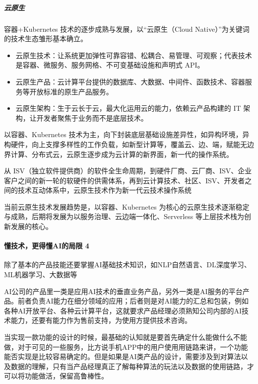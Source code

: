 \documentclass[letterpaper,10pt,english]{sphinxmanual}
\begin{document}
\subparagraph{云原生}
\label{\detokenize{chapter_idea/understand_tech:id32}}
容器+Kubernetes 技术的逐步成熟与发展，以“云原生（Cloud
Native）”为关键词的技术生态雏形基本确立。
\begin{itemize}
\item {} 
云原生技术：让系统更加弹性可靠容错、松耦合、易管理、可观察；代表技术是容器、微服务、服务网格、不可变基础设施和声明式
API。

\item {} 
云原生产品：云计算平台提供的数据库、大数据、中间件、函数技术、容器服务等开放标准的原生产品服务。

\item {} 
云原生架构：生于云长于云，最大化运用云的能力，依赖云产品构建的 IT
架构，让开发者聚焦于业务而不是底层技术。

\end{itemize}

以容器、Kubernetes
技术为主，向下封装底层基础设施差异性，如异构环境，异构硬件，向上支撑多样性的工作负载，如新型计算等，覆盖云、边、端，赋能无边界计算、分布式云，云原生逐步成为云计算的新界面，新一代的操作系统。

从
ISV（独立软件提供商）的软件全生命周期，到硬件厂商、云厂商、ISV、企业客户之间的新一轮的软硬件的供需体系，再到云计算技术、社区、ISV、开发者之间的技术互动体系中，云原生技术作为新一代云技术操作系统

当前云原生技术发展趋势是，以容器、Kubernetes
为核心的云原生技术逐渐稳定与成熟，后期将发展为以服务治理、云边端一体化、Serverless
等上层技术栈为创新发展的核心。


\paragraph{懂技术，更得懂AI的局限 4\sphinxfootnotemark[445]}
\label{\detokenize{chapter_idea/understand_tech:ai-4}}%
\begin{footnotetext}[445]\sphinxAtStartFootnote
{}
%
\end{footnotetext}\ignorespaces 
除了基本的产品技能还要掌握AI基础技术知识，如NLP自然语言、DL深度学习、ML机器学习、大数据等

AI公司的产品里一类是应用AI技术的垂直业务产品，另外一类是AI服务的平台产品。前者负责AI能力在细分领域的应用；后者则是对AI能力的汇总和包装，例如各种AI开放平台、各种云计算平台，这就要求产品经理必须熟知公司内部的AI技术能力，还要有能力作为售前支持，为使用方提供技术咨询。

当实现一款功能的设计的时候，最基础的认知就是要首先确定什么能做什么不能做，对于可见的一些服务，比方说手机APP中的用户使用用链路来讲，一个功能能否实现是比较容易确定的。但是如果是AI类产品的设计，需要涉及到对算法以及数据的理解，只有当产品经理真正了解每种算法的玩法以及数据的使用链路，才可以将功能做活，保留高鲁棒性。
\end{document}
